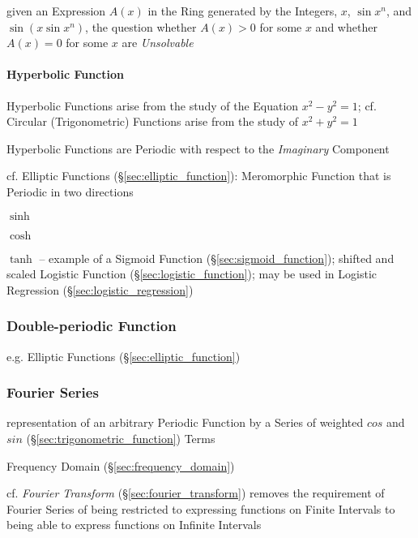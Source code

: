 given an Expression $A(x)$ in the Ring generated by the Integers, $x$, $\sin
x^n$, and $\sin(x \sin x^n)$, the question whether $A(x) > 0$ for some $x$ and
whether $A(x) = 0$ for some $x$ are \emph{Unsolvable}



\paragraph{Hyperbolic Function}\label{sec:hyperbolic_function}\hfill

Hyperbolic Functions arise from the study of the Equation $x^2 - y^2 = 1$; cf.
Circular (Trigonometric) Functions arise from the study of $x^2 + y^2 = 1$

Hyperbolic Functions are Periodic with respect to the \emph{Imaginary}
Component

cf. Elliptic Functions (\S\ref{sec:elliptic_function}): Meromorphic Function
that is Periodic in two directions

$\sinh$

$\cosh$

$\tanh$ -- example of a Sigmoid Function (\S\ref{sec:sigmoid_function}); shifted
and scaled Logistic Function (\S\ref{sec:logistic_function}); may be used in
Logistic Regression (\S\ref{sec:logistic_regression})



\subsubsection{Double-periodic Function}\label{sec:double_periodic}

e.g. Elliptic Functions (\S\ref{sec:elliptic_function})



\subsubsection{Fourier Series}\label{sec:fourier_series}

representation of an arbitrary Periodic Function by a Series of weighted $cos$
and $sin$ (\S\ref{sec:trigonometric_function}) Terms

\fist Frequency Domain (\S\ref{sec:frequency_domain})

\fist cf. \emph{Fourier Transform} (\S\ref{sec:fourier_transform}) removes the
requirement of Fourier Series of being restricted to expressing functions on
Finite Intervals to being able to express functions on Infinite Intervals

